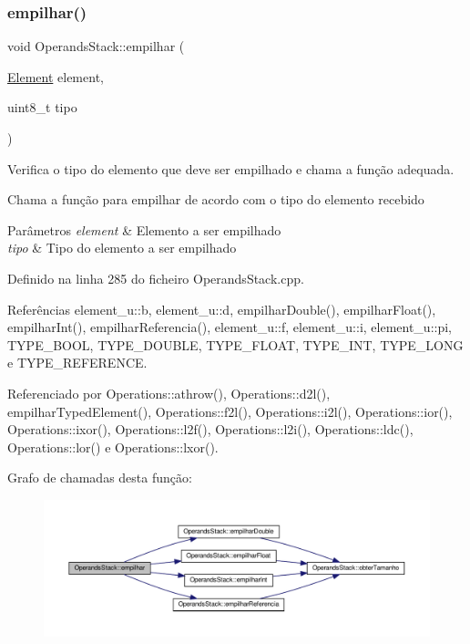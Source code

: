 \subsubsection{\texorpdfstring{empilhar()}{empilhar()}}
{\footnotesize\ttfamily void Operands\+Stack\+::empilhar (\begin{DoxyParamCaption}\item[{\hyperlink{BasicTypes_8h_a8132f4f0515064141e31e606660df561}{Element}}]{element,  }\item[{uint8\+\_\+t}]{tipo }\end{DoxyParamCaption})}



Verifica o tipo do elemento que deve ser empilhado e chama a função adequada. 

Chama a função para empilhar de acordo com o tipo do elemento recebido


\begin{DoxyParams}{Parâmetros}
{\em element} & Elemento a ser empilhado \\
\hline
{\em tipo} & Tipo do elemento a ser empilhado \\
\hline
\end{DoxyParams}


Definido na linha 285 do ficheiro Operands\+Stack.\+cpp.



Referências element\+\_\+u\+::b, element\+\_\+u\+::d, empilhar\+Double(), empilhar\+Float(), empilhar\+Int(), empilhar\+Referencia(), element\+\_\+u\+::f, element\+\_\+u\+::i, element\+\_\+u\+::pi, T\+Y\+P\+E\+\_\+\+B\+O\+OL, T\+Y\+P\+E\+\_\+\+D\+O\+U\+B\+LE, T\+Y\+P\+E\+\_\+\+F\+L\+O\+AT, T\+Y\+P\+E\+\_\+\+I\+NT, T\+Y\+P\+E\+\_\+\+L\+O\+NG e T\+Y\+P\+E\+\_\+\+R\+E\+F\+E\+R\+E\+N\+CE.



Referenciado por Operations\+::athrow(), Operations\+::d2l(), empilhar\+Typed\+Element(), Operations\+::f2l(), Operations\+::i2l(), Operations\+::ior(), Operations\+::ixor(), Operations\+::l2f(), Operations\+::l2i(), Operations\+::ldc(), Operations\+::lor() e Operations\+::lxor().

Grafo de chamadas desta função\+:
\nopagebreak
\begin{figure}[H]
\begin{center}
\leavevmode
\includegraphics[width=350pt]{classOperandsStack_a50b642d5ff6a7a1f56b8cfc75bde1192_cgraph}
\end{center}
\end{figure}
\mbox{\label{classOperandsStack_aca2be3100b76689949f029196a893712}} 
